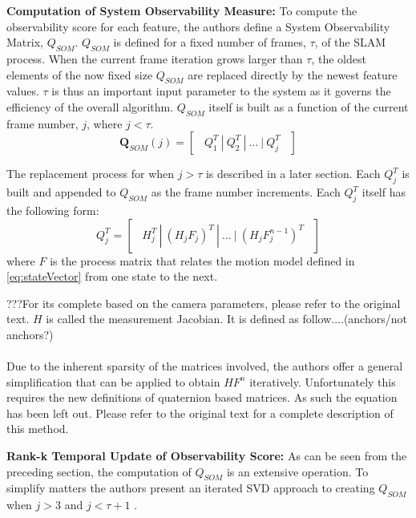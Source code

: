 \documentclass[10pt,twocolumn,letterpaper]{article}
\begin{document}
\textbf{Computation of System Observability Measure:} To compute the observability score for each feature,
the authors define a System Observability Matrix, ${Q}_{SOM}$. ${Q}_{SOM}$ is defined for a fixed number 
of frames, $\tau$, of the SLAM process. When the current frame iteration grows larger than $\tau$, the oldest
 elements of the now fixed size ${Q}_{SOM}$ are replaced directly by the newest feature values. $\tau$ is 
 thus an important input parameter to the system as it governs the efficiency of the overall algorithm. 
 ${Q}_{SOM}$ itself is built as a function of the current frame number, $j$, where 
 $j<\tau$. 
\begin{equation} \label{eq:qsom}
\boldsymbol{Q}_{SOM}(j) = \begin{bmatrix} \ \ Q_1^T \ | \ Q_2^T \ | \ ... \ | \ Q_j^T  \ \ \end{bmatrix}
\end{equation}

The replacement process for when $j>\tau$ is described in a later section. Each $Q_j^T$ is built and appended to ${Q}_{SOM}$ as the frame number increments. Each $Q_j^T$ itself has the following form: 
\begin{equation} \label{eq:Qjjj}
Q_j^T = \begin{bmatrix} \ \ H_j^T \ | \ (H_j F_j)^T \ | \ ... \ | \ (H_j F_j^{n-1})^T  \ \ \end{bmatrix}
\end{equation}
where $F$ is the process matrix that relates the motion model defined in \eqref{eq:stateVector} 
from one state to the next. 

???For its complete based on the camera parameters, please refer to the original text. $H$ is called the measurement Jacobian. It is defined as follow....(anchors/not anchors?) \\ \\ 

Due to the inherent sparsity of the matrices involved, the authors offer a  general simplification that can be applied to obtain $HF^n$ iteratively. Unfortunately this requires the new definitions of quaternion based matrices. As such the equation has been left out. Please refer to the original text for a complete description of this method.

\textbf{Rank-k Temporal Update of Observability Score:} As can be seen from the preceding section, the computation of $Q_{SOM}$ is an extensive operation. To simplify matters the authors present an iterated SVD approach to creating $Q_{SOM}$ when $j>3$  and $j<\tau + 1$ . 
\end{document}
